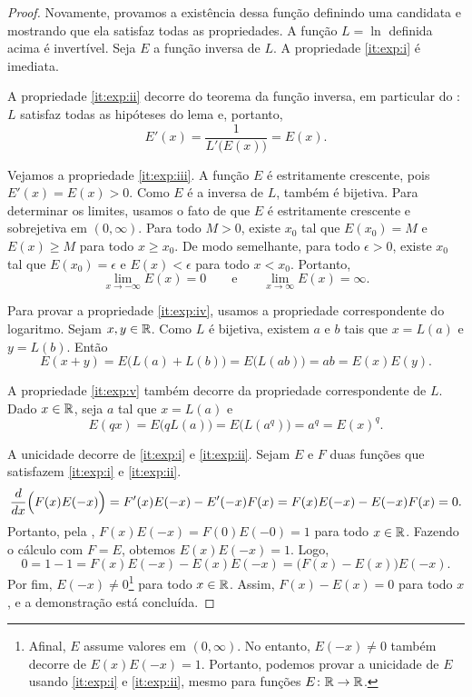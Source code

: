 \begin{proof}
Novamente, provamos a existência dessa função definindo uma candidata
e mostrando que ela satisfaz todas as propriedades.
A função $L = \ln$ definida acima é invertível. Seja $E$ a função inversa
de $L$. A propriedade \ref{it:exp:i} é imediata.

A propriedade \ref{it:exp:ii} decorre do teorema da função inversa,
em particular do : $L$ satisfaz todas as hipóteses
do lema e, portanto,
\begin{equation*}
E'(x) = \frac{1}{L'\bigl(E(x)\bigr)} = E(x) .
\end{equation*}

Vejamos a propriedade \ref{it:exp:iii}.
A função $E$ é estritamente crescente, pois
$E'(x) = E(x) > 0$. Como $E$ é a inversa de $L$, também é bijetiva.
Para determinar os limites, usamos o fato de que $E$ é estritamente crescente
e sobrejetiva em $(0,\infty)$.
Para todo $M > 0$, existe $x_0$ tal que
$E(x_0) = M$ e $E(x) \geq M$ para todo $x \geq x_0$.
De modo semelhante, para todo $\epsilon > 0$, existe
$x_0$ tal que $E(x_0) = \epsilon$ e
$E(x) < \epsilon$ para todo $x < x_0$.
Portanto,
\begin{equation*}
\lim_{x\to -\infty} E(x) = 0 \qquad \text{e} \qquad
\lim_{x\to \infty} E(x) = \infty .
\end{equation*}

Para provar a propriedade \ref{it:exp:iv}, usamos a propriedade
correspondente do logaritmo.
Sejam $x, y \in {\mathbb{R}}$.
Como $L$ é bijetiva, existem $a$ e $b$ tais que $x = L(a)$ e $y = L(b)$.
Então
\begin{equation*}
E(x+y) =
E\bigl(L(a)+L(b)\bigr) = 
E\bigl(L(ab)\bigr) = ab = E(x)E(y)  .
\end{equation*}

A propriedade \ref{it:exp:v} também decorre da propriedade correspondente
de $L$.
Dado $x \in {\mathbb{R}}$, seja $a$ tal que $x = L(a)$ e
\begin{equation*}
E(qx) = E\bigl(qL(a)\bigr)
=
E\bigl(L(a^q)\bigr) = a^q = {E(x)}^q .
\end{equation*}

A unicidade decorre de
\ref{it:exp:i} e
\ref{it:exp:ii}.
Sejam $E$ e $F$
duas funções que satisfazem
\ref{it:exp:i} e \ref{it:exp:ii}.
\begin{equation*}
\frac{d}{dx} \Bigl( F(x)E(-x) \Bigr)
=
F'(x)E(-x) - E'(-x)F(x)
=
F(x)E(-x) - E(-x)F(x) = 0 .
\end{equation*}
Portanto, pela ,
$F(x)E(-x) = F(0)E(-0) = 1$ para todo $x \in {\mathbb{R}}$.
Fazendo o cálculo com $F = E$,
obtemos $E(x)E(-x) = 1$.
Logo,
\begin{equation*}
0 = 1-1 = F(x)E(-x) - E(x)E(-x) = \bigl(F(x)-E(x)\bigr) E(-x) .
\end{equation*}
Por fim, $E(-x) \neq 0$\footnote{Afinal,
$E$ assume valores em $(0,\infty)$. No entanto, $E(-x) \neq 0$ também decorre
de $E(x)E(-x) = 1$. Portanto, podemos provar a unicidade de $E$
usando \ref{it:exp:i} e \ref{it:exp:ii}, mesmo para funções
$E \colon {\mathbb{R}} \to {\mathbb{R}}$.}
para todo $x \in {\mathbb{R}}$.
Assim,
$F(x)-E(x) = 0$ para todo $x$, e a demonstração está concluída.
\end{proof}

